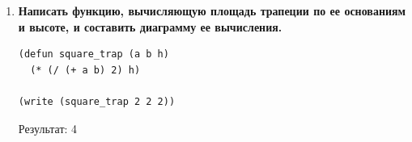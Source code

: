 \documentclass[a4paper,14pt]{extreport} %
\begin{document}
\begin{enumerate}
\begin{lstlisting}
(write (cathet 3 5))
\end{lstlisting}

Результат: 4.0

\hfill

\hfill

\hfill

\hfill

\hfill

\hfill

\hfill

\hfill

\hfill


\item \textbf{Написать функцию, вычисляющую площадь трапеции по ее основаниям и высоте, и составить диаграмму ее вычисления.}

\begin{lstlisting}
(defun square_trap (a b h)
  (* (/ (+ a b) 2) h) 

(write (square_trap 2 2 2))
\end{lstlisting}

Результат: 4

\end{enumerate}
\end{document}
